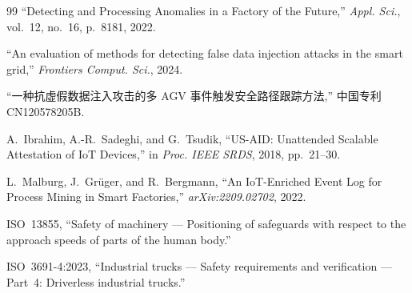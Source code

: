 \documentclass[manuscript,screen,review]{acmart}
\begin{document}
\begin{thebibliography}{99}
``Detecting and Processing Anomalies in a Factory of the Future,''
\textit{Appl. Sci.}, vol.~12, no.~16, p.~8181, 2022.

``An evaluation of methods for detecting false data injection attacks in the smart grid,''
\textit{Frontiers Comput. Sci.}, 2024.

``一种抗虚假数据注入攻击的多 AGV 事件触发安全路径跟踪方法,''
中国专利 CN120578205B.

A.~Ibrahim, A.-R.~Sadeghi, and G.~Tsudik,
``US-AID: Unattended Scalable Attestation of IoT Devices,''
in \textit{Proc. IEEE SRDS}, 2018, pp.~21--30.

L.~Malburg, J.~Gr\"uger, and R.~Bergmann,
``An IoT-Enriched Event Log for Process Mining in Smart Factories,''
\textit{arXiv:2209.02702}, 2022.

ISO~13855,
``Safety of machinery --- Positioning of safeguards with respect to the approach speeds of parts of the human body.''

ISO~3691-4:2023,
``Industrial trucks --- Safety requirements and verification --- Part~4: Driverless industrial trucks.''

\end{thebibliography}
\end{document}
